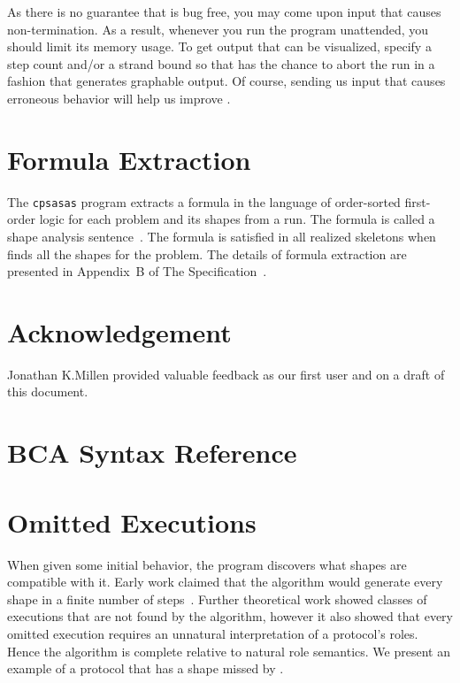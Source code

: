 \documentclass[12pt]{article}
\begin{document}
As there is no guarantee that {\cpsa} is bug free, you may come upon
input that causes non-termination.  As a result, whenever you run the
program unattended, you should limit its memory usage.  To get output
that can be visualized, specify a step count and/or a strand bound so
that {\cpsa} has the chance to abort the run in a fashion that
generates graphable output.  Of course, sending us input that causes
erroneous behavior will help us improve {\cpsa}.

\section{Formula Extraction}\label{sec:formulas}

The \texttt{cpsasas} program extracts a formula in the language of
order-sorted first-order logic for each problem and its shapes from a
{\cpsa} run. The formula is called a shape analysis
sentence~\cite{Ramsdell12}. The formula is satisfied in all realized
skeletons when {\cpsa} finds all the shapes for the problem.  The
details of formula extraction are presented in Appendix~B of The
{\cpsa} Specification~\cite{cpsaspec09}.

\section*{Acknowledgement}

Jonathan K.\@ Millen provided valuable feedback as our first {\cpsa}
user and on a draft of this document.

\appendix

\section{BCA Syntax Reference}\label{sec:syntax reference}



\section{Omitted Executions}\label{sec:omitted executions}

When given some initial behavior, the {\cpsa} program discovers what
shapes are compatible with it.  Early work claimed that the {\cpsa}
algorithm would generate every shape in a finite number of
steps~\cite{DoghmiGuttmanThayer07,Guttman11}.  Further theoretical
work showed classes of executions that are not found by the algorithm,
however it also showed that every omitted execution requires an
unnatural interpretation of a protocol's roles.  Hence the algorithm
is complete relative to natural role semantics.  We present an example
of a protocol that has a shape missed by {\cpsa}.
\end{document}
